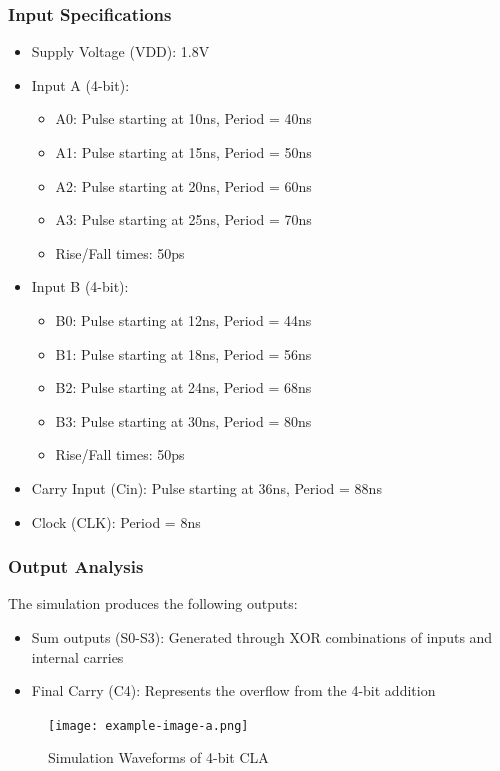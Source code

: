 \documentclass[conference]{IEEEtran}
\begin{document}
\subsubsection{Input Specifications}
\begin{itemize}
    \item Supply Voltage (VDD): 1.8V
    \item Input A (4-bit):
    \begin{itemize}
        \item A0: Pulse starting at 10ns, Period = 40ns
        \item A1: Pulse starting at 15ns, Period = 50ns
        \item A2: Pulse starting at 20ns, Period = 60ns
        \item A3: Pulse starting at 25ns, Period = 70ns
        \item Rise/Fall times: 50ps
    \end{itemize}
    
    \item Input B (4-bit):
    \begin{itemize}
        \item B0: Pulse starting at 12ns, Period = 44ns
        \item B1: Pulse starting at 18ns, Period = 56ns
        \item B2: Pulse starting at 24ns, Period = 68ns
        \item B3: Pulse starting at 30ns, Period = 80ns
        \item Rise/Fall times: 50ps
    \end{itemize}
    \item Carry Input (Cin): Pulse starting at 36ns, Period = 88ns
    \item Clock (CLK): Period = 8ns
\end{itemize}

\subsubsection{Output Analysis}
The simulation produces the following outputs:
\begin{itemize}
    \item Sum outputs (S0-S3): Generated through XOR combinations of inputs and internal carries
    \item Final Carry (C4): Represents the overflow from the 4-bit addition
\end{itemize}

\begin{figure}[H]
    \centering
    \texttt{[image: example-image-a.png]}
    \caption{Simulation Waveforms of 4-bit CLA}
    \label{fig:cla_waveform}
\end{figure}
\end{document}
